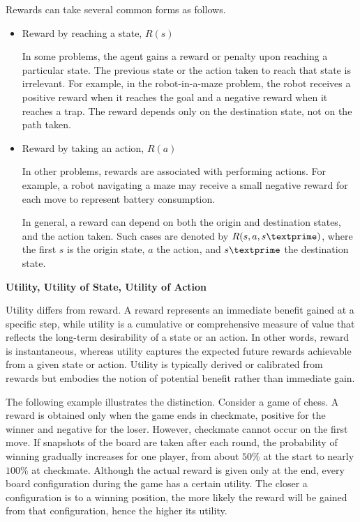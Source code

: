 Rewards can take several common forms as follows.
\begin{itemize}
	\item Reward by reaching a state, $R(s)$
	
	In some problems, the agent gains a reward or penalty upon reaching a particular state. The previous state or the action taken to reach that state is irrelevant.  
	For example, in the robot-in-a-maze problem, the robot receives a positive reward when it reaches the goal and a negative reward when it reaches a trap. The reward depends only on the destination state, not on the path taken.
	
	\item Reward by taking an action, $R(a)$
	
	In other problems, rewards are associated with performing actions. For example, a robot navigating a maze may receive a small negative reward for each move to represent battery consumption.  
	
	In general, a reward can depend on both the origin and destination states, and the action taken. Such cases are denoted by $R(s, a, s\textprime)$, where the first $s$ is the origin state, $a$ the action, and $s\textprime$ the destination state.
\end{itemize}



\vspace{0.1in}
\noindent \textbf{Utility, Utility of State, Utility of Action}
\vspace{0.1in}

Utility differs from reward. A reward represents an immediate benefit gained at a specific step, while utility is a cumulative or comprehensive measure of value that reflects the long-term desirability of a state or an action. In other words, reward is instantaneous, whereas utility captures the expected future rewards achievable from a given state or action. Utility is typically derived or calibrated from rewards but embodies the notion of potential benefit rather than immediate gain.

The following example illustrates the distinction. Consider a game of chess. A reward is obtained only when the game ends in checkmate, positive for the winner and negative for the loser. However, checkmate cannot occur on the first move. If snapshots of the board are taken after each round, the probability of winning gradually increases for one player, from about $50\%$ at the start to nearly $100\%$ at checkmate. Although the actual reward is given only at the end, every board configuration during the game has a certain utility. The closer a configuration is to a winning position, the more likely the reward will be gained from that configuration, hence the higher its utility.

